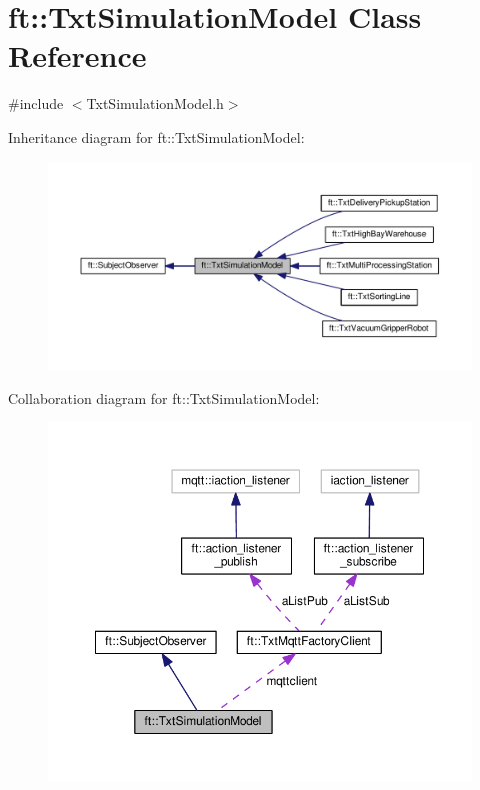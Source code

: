 \hypertarget{classft_1_1_txt_simulation_model}{}\section{ft\+:\+:Txt\+Simulation\+Model Class Reference}
\label{classft_1_1_txt_simulation_model}


{\ttfamily \#include $<$Txt\+Simulation\+Model.\+h$>$}



Inheritance diagram for ft\+:\+:Txt\+Simulation\+Model\+:
\nopagebreak
\begin{figure}[H]
\begin{center}
\leavevmode
\includegraphics[width=350pt]{classft_1_1_txt_simulation_model__inherit__graph}
\end{center}
\end{figure}


Collaboration diagram for ft\+:\+:Txt\+Simulation\+Model\+:
\nopagebreak
\begin{figure}[H]
\begin{center}
\leavevmode
\includegraphics[width=350pt]{classft_1_1_txt_simulation_model__coll__graph}
\end{center}
\end{figure}

